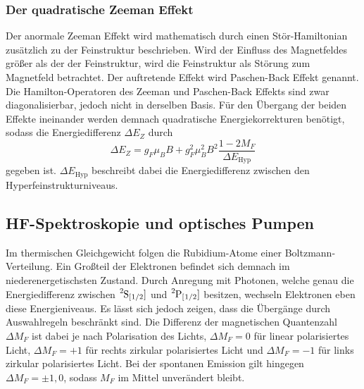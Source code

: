 \subsubsection{Der quadratische Zeeman Effekt}
Der anormale Zeeman Effekt wird mathematisch durch einen Stör-Hamiltonian
zusätzlich zu der Feinstruktur beschrieben. Wird der Einfluss des 
Magnetfeldes größer als der der Feinstruktur, wird die Feinstruktur
als Störung zum Magnetfeld betrachtet. Der auftretende Effekt wird 
Paschen-Back Effekt genannt. Die Hamilton-Operatoren des Zeeman und 
Paschen-Back Effekts sind zwar diagonalisierbar, jedoch nicht in derselben Basis.
Für den Übergang der beiden Effekte ineinander werden
demnach quadratische Energiekorrekturen benötigt, sodass die 
Energiedifferenz $\Delta E_Z$ durch 
\begin{equation}
    \Delta E_Z=g_F\mu_BB+g_F^2\mu_B^2B^2\frac{1-2M_F}{\Delta E_\text{Hyp}}
    \label{eqn:zeemanquadrat}
\end{equation}
gegeben ist. $\Delta E_\text{Hyp}$ beschreibt dabei die Energiedifferenz
zwischen den Hyperfeinstrukturniveaus.

\subsection{HF-Spektroskopie und optisches Pumpen}
Im thermischen Gleichgewicht folgen die Rubidium-Atome einer 
Boltzmann-Verteilung. Ein Großteil der Elektronen befindet sich 
demnach im niederenergetischsten Zustand. Durch Anregung mit Photonen,
welche genau die Energiedifferenz zwischen $\ce{^{2}S_[1/2]}$ und 
$\ce{^{2}P_[1/2]}$ besitzen, wechseln Elektronen eben diese Energieniveaus.
Es lässt sich jedoch zeigen, dass die Übergänge durch Auswahlregeln 
beschränkt sind. Die Differenz der magnetischen Quantenzahl $\Delta M_F$
ist dabei je nach Polarisation des Lichts, $\Delta M_F=0$ für 
linear polarisiertes Licht, $\Delta M_F=+1$ für rechts zirkular
polarisiertes Licht und $\Delta M_F=-1$ für links zirkular polarisiertes
Licht. Bei der spontanen Emission gilt hingegen $\Delta M_F =\pm 1,0$, 
sodass $M_F$ im Mittel unverändert bleibt. 

